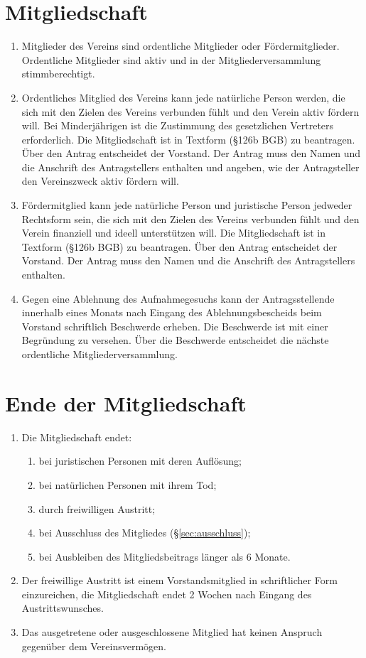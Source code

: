 \documentclass[ngerman]{article}
\begin{document}
\section{Mitgliedschaft}
\begin{enumerate}
  \item Mitglieder des Vereins sind ordentliche Mitglieder oder Fördermitglieder. Ordentliche Mitglieder sind aktiv und in der Mitgliederversammlung stimmberechtigt.
  \item Ordentliches Mitglied des Vereins kann jede natürliche Person werden, die sich mit den Zielen des Vereins verbunden fühlt und den Verein aktiv fördern will. Bei Minderjährigen ist die Zustimmung des gesetzlichen Vertreters erforderlich. Die Mitgliedschaft ist in Textform (§126b BGB) zu beantragen. Über den Antrag entscheidet der Vorstand. Der Antrag muss den Namen und die Anschrift des Antragstellers enthalten und angeben, wie der Antragsteller den Vereinszweck aktiv fördern will.
  \item Fördermitglied kann jede natürliche Person und juristische Person jedweder Rechtsform sein, die sich mit den Zielen des Vereins verbunden fühlt und den Verein finanziell und ideell unterstützen will. Die Mitgliedschaft ist in Textform (§126b BGB) zu beantragen. Über den Antrag entscheidet der Vorstand. Der Antrag muss den Namen und die Anschrift des Antragstellers enthalten. 
  \item Gegen eine Ablehnung des Aufnahmegesuchs kann der Antragsstellende innerhalb eines Monats nach Eingang des Ablehnungsbescheids beim Vorstand schriftlich Beschwerde erheben. Die Beschwerde ist mit einer Begründung zu versehen. Über die Beschwerde entscheidet die nächste ordentliche Mitgliederversammlung.
\end{enumerate}


\section{Ende der Mitgliedschaft}
\begin{enumerate}
  \item Die Mitgliedschaft endet:
  \begin{enumerate}
    \item bei juristischen Personen mit deren Auflösung;
    \item bei natürlichen Personen mit ihrem Tod;
    \item durch freiwilligen Austritt;
    \item bei Ausschluss des Mitgliedes (§\ref{sec:ausschluss});
    \item bei Ausbleiben des Mitgliedsbeitrags länger als 6 Monate.
  \end{enumerate}
  \item Der freiwillige Austritt ist einem Vorstandsmitglied in schriftlicher Form einzureichen, die Mitgliedschaft endet 2 Wochen nach Eingang des Austrittswunsches.
  \item Das ausgetretene oder ausgeschlossene Mitglied hat keinen Anspruch gegenüber dem Vereinsvermögen.
\end{enumerate}
\end{document}
